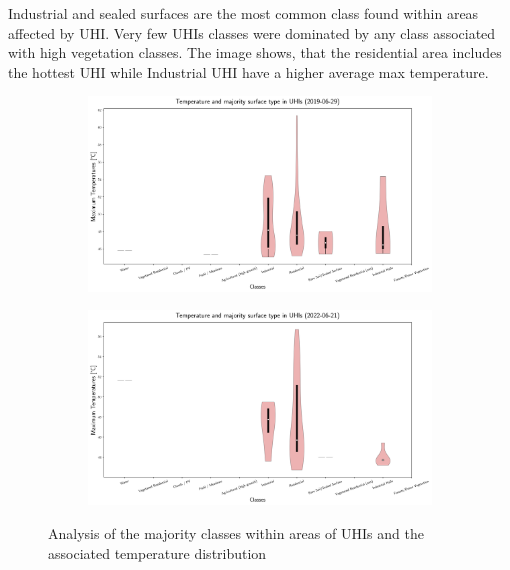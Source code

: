 \documentclass[12pt,a4paper, english,twoside]{scrartcl}
\begin{document}
      Industrial and sealed surfaces are the most common class found within areas affected by \gls{UHI}.
      Very few \glspl{UHI} classes were dominated by any class associated with high vegetation classes.
      The image shows, that the residential area includes the hottest \gls{UHI} while Industrial UHI have a higher average max temperature. 
      \begin{figure}[!htbp]
      \begin{subfigure}[b]{\textwidth}
        \centering
        \includegraphics[width=\textwidth]{img/Temperature and majority surface type in UHIs (2019-06-29).png}
        \label{fig:majorityClasses}
      \end{subfigure}

      \begin{subfigure}[b]{\textwidth}
        \centering
        \includegraphics[width=\textwidth]{img/Temperature and majority surface type in UHIs (2022-06-21).png}
        \label{fig:majorityClasses2}
      \end{subfigure}
      \caption{Analysis of the majority classes within areas of \glspl{UHI} and the associated temperature distribution\label{fig:tempInUHIs}}
      \end{figure}  
      
\end{document}
